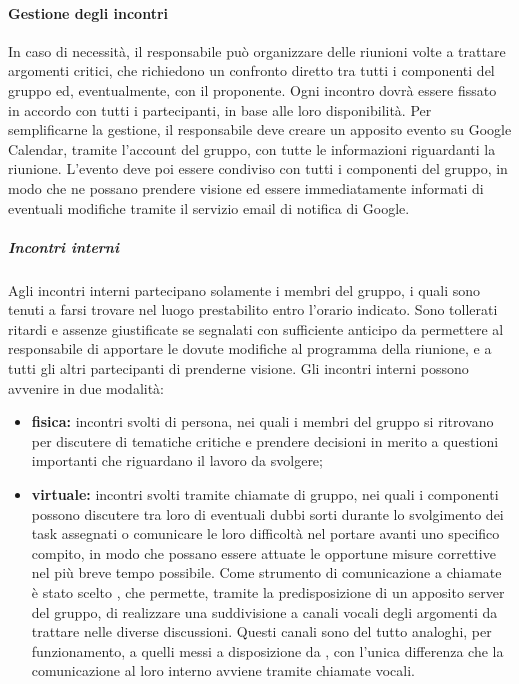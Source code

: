 		\paragraph{Gestione degli incontri}

			In caso di necessità, il responsabile può organizzare delle riunioni volte a trattare argomenti critici, che richiedono un confronto diretto tra tutti i componenti del gruppo ed, eventualmente, con il proponente.
			\newline
			Ogni incontro dovrà essere fissato in accordo con tutti i partecipanti, in base alle loro disponibilità. Per semplificarne la gestione, il responsabile deve creare un apposito evento su Google Calendar, tramite l'account del gruppo, con tutte le informazioni riguardanti la riunione. L'evento deve poi essere condiviso con tutti i componenti del gruppo, in modo che ne possano prendere visione ed essere immediatamente informati di eventuali modifiche tramite il servizio email di notifica di Google.
			
			\subparagraph{Incontri interni}

				Agli incontri interni partecipano solamente i membri del gruppo, i quali sono tenuti a farsi trovare nel luogo prestabilito entro l'orario indicato.
				\newline
				Sono tollerati ritardi e assenze giustificate se segnalati con sufficiente anticipo da permettere al responsabile di apportare le dovute modifiche al programma della riunione, e a tutti gli altri partecipanti di prenderne visione.
				\newline
				Gli incontri interni possono avvenire in due modalità:
				
				\begin{itemize}
					\item \textbf{fisica:} incontri svolti di persona, nei quali i membri del gruppo si ritrovano per discutere di tematiche critiche e prendere decisioni in merito a questioni importanti che riguardano il lavoro da svolgere;
					\item \textbf{virtuale:} incontri svolti tramite chiamate di gruppo, nei quali i componenti possono discutere tra loro di eventuali dubbi sorti durante lo svolgimento dei task assegnati o comunicare le loro difficoltà nel portare avanti uno specifico compito, in modo che possano essere attuate le opportune misure correttive nel più breve tempo possibile.
					\newline
					Come strumento di comunicazione a chiamate è stato scelto , che permette, tramite la predisposizione di un apposito server del gruppo, di realizzare una suddivisione a canali vocali degli argomenti da trattare nelle diverse discussioni. Questi canali sono del tutto analoghi, per funzionamento, a quelli messi a disposizione da , con l'unica differenza che la comunicazione al loro interno avviene tramite chiamate vocali.
				\end{itemize}

